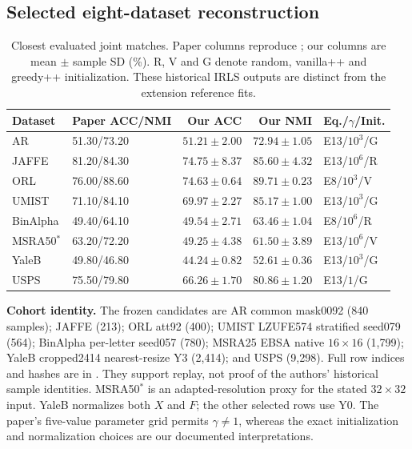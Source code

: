 {\subsection{Selected eight-dataset reconstruction}

\begin{table}[!htbp]
\centering
\caption{Closest evaluated joint matches. Paper columns reproduce
\citet{chang2015ssc}; our columns are mean $\pm$ sample SD (\%).
R, V and G denote random, vanilla++ and greedy++ initialization.
These historical IRLS outputs are distinct from the extension reference fits.}
\label{tab:reconstruction}
\small
\setlength{\tabcolsep}{3pt}
\begin{tabular}{@{}llrrl@{}}
\toprule
Dataset & Paper ACC/NMI & Our ACC & Our NMI & Eq./$\gamma$/Init. \\
\midrule
AR & 51.30/73.20
   & $51.21\pm2.00$ & $72.94\pm1.05$ & E13/$10^3$/G \\
JAFFE & 81.20/84.30
   & $74.75\pm8.37$ & $85.60\pm4.32$ & E13/$10^6$/R \\
ORL & 76.00/88.60
   & $74.63\pm0.64$ & $89.71\pm0.23$ & E8/$10^3$/V \\
UMIST & 71.10/84.10
   & $69.97\pm2.27$ & $85.17\pm1.00$ & E13/$10^3$/G \\
BinAlpha & 49.40/64.10
   & $49.54\pm2.71$ & $63.46\pm1.04$ & E8/$10^6$/R \\
MSRA50$^*$ & 63.20/72.20
   & $49.25\pm4.38$ & $61.50\pm3.89$ & E13/$10^6$/V \\
YaleB & 49.80/46.80
   & $44.24\pm0.82$ & $52.61\pm0.36$ & E13/$10^3$/G \\
USPS & 75.50/79.80
   & $66.26\pm1.70$ & $80.86\pm1.20$ & E13/$1$/G \\
\bottomrule
\end{tabular}
\end{table}

\noindent\textbf{Cohort identity.}
The frozen candidates are AR common mask0092 (840 samples); JAFFE (213);
ORL att92 (400); UMIST LZUFE574 stratified seed079 (564); BinAlpha per-letter
seed057 (780); MSRA25 EBSA native $16\times16$ (1,799); YaleB cropped2414
nearest-resize Y3 (2,414); and USPS (9,298). Full row indices and hashes are in
. They support replay, not proof
of the authors' historical sample identities. MSRA50$^*$ is an adapted-resolution
proxy for the stated $32\times32$ input. YaleB normalizes both $X$ and $F$;
the other selected rows use Y0. The paper's five-value parameter grid permits
$\gamma\ne1$, whereas the exact initialization and normalization choices are
our documented interpretations.

}
